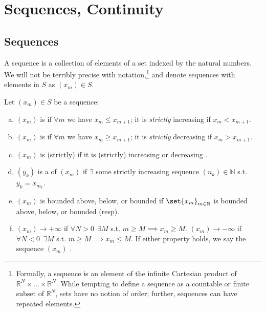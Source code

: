 \documentclass{article}
\begin{document}
\displayoptions

\section{Sequences, Continuity}
\label{sec:sequences_continuity}

\localtableofcontents

\subsection{Sequences}
\label{sub:sequences}

A sequence is a collection of elements of a set indexed by the natural numbers. We will not be terribly precise with notation,\footnote{Formally, a sequence is an element of the infinite Cartesian product of $\mathbb{R}^N \times \ldots \times \mathbb{R}^N$. While tempting to define a sequence as a countable or finite subset of $\mathbb{R}^N$, sets have no notion of order; further, sequences can have repeated elements.} and denote sequences with elements in $S$ as $(x_m) \in S$.
\begin{definition}
  Let $(x_m) \in S$ be a sequence:
  \begin{enumerate}[a)]
    \item $(x_m)$ is  if $\forall m$ we have $x_m \le x_{m + 1}$; it is \textit{strictly} increasing if $x_m < x_{m + 1}$.
    \item $(x_m)$ is  if $\forall m$ we have $x_m \ge x_{m + 1}$; it is \textit{strictly} decreasing if $x_m > x_{m + 1}$.
    \item $(x_m)$ is (strictly)  if it is (strictly) increasing or decreasing .
    \item $(y_k)$ is a  of $(x_m)$ if $\exists$ some strictly increasing sequence $(n_k) \in \mathbb{N}$ s.t. $y_k = x_{m_k}$.
    \item $(x_m)$ is bounded above, below, or bounded if $\set{x_m}_{m \in \mathbb{N}}$ is bounded above, below, or bounded (resp).
    \item $(x_m) \to +\infty$ if $\forall N > 0 ~~ \exists M$ s.t. $m \ge M \implies x_m \ge M$.  $(x_m) \to -\infty$ if $\forall N < 0 ~~ \exists M$ s.t. $m \ge M \implies x_m \le M$. If either property holds, we say the sequence $(x_m)$ .
  \end{enumerate}
\end{definition}
\end{document}
